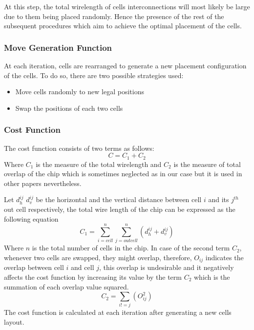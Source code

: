 \documentclass[conference]{IEEEtran}
\begin{document}
At this step, the total wirelength of cells interconnections will most likely be large due to them being placed randomly. Hence the presence of the rest of the subsequent procedures which aim to achieve the optimal placement of the cells.
\medskip

\subsubsection{Move Generation Function}

At each iteration, cells are rearranged to generate a new placement configuration of the cells. To do so, there are two possible strategies used:
\begin{itemize}
    \item Move cells randomly to new legal positions 
    \item Swap the positions of each two cells
\end{itemize}
\medskip

\subsubsection{Cost Function}

The cost function consists of two terms as follows:
\begin{equation}
    C = C_{1} + C_{2}
\end{equation}
Where $C_{1}$ is the measure of the total wirelength and $C_{2}$ is the measure of total overlap of the chip which is sometimes neglected as in our case but it is used in other papers \cite{b16} nevertheless.

Let $d_{h}^{ij}$ $d_{v}^{ij}$ be the horizontal and the vertical distance between cell $i$ and its $j^{th}$ out cell respectively, the total wire length of the chip can be expressed as the following equation 
\begin{equation}
    C_{1} = \sum_{i=cell}^{n} \sum_{j=out cell}^{n} (d_{h}^{ij} + d_{v}^{ij})
\end{equation}
Where $n$ is the total number of cells in the chip. In case of the second term $C_{2}$, whenever two cells are swapped, they might overlap, therefore, $O_{ij}$ indicates the overlap between cell $i$ and cell $j$, this overlap is undesirable and it negatively affects the cost function by increasing its value by the term $C_{2}$ which is the summation of each overlap value squared.
\begin{equation}
    C_{2} = \sum_{i!=j} (O_{ij}^{2})
\end{equation}
The cost function is calculated at each iteration after generating a new cells layout.
\medskip
\end{document}

